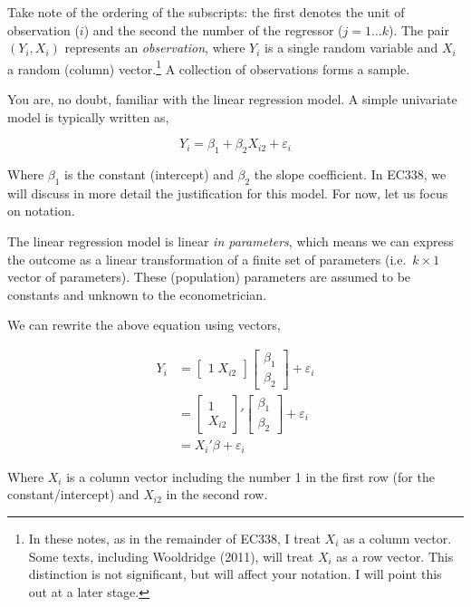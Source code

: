 \documentclass[
  letterpaper,
  DIV=11,
  numbers=noendperiod]{scrreprt}
\begin{document}
Take note of the ordering of the subscripts: the first denotes the unit
of observation (\(i\)) and the second the number of the regressor
(\(j=1\dots k\)). The pair \((Y_i,X_i)\) represents an
\emph{observation}, where \(Y_i\) is a single random variable and
\(X_i\) a random (column) vector.\footnote{In these notes, as in the
  remainder of EC338, I treat \(X_i\) as a column vector. Some texts,
  including Wooldridge (2011), will treat \(X_i\) as a row vector. This
  distinction is not significant, but will affect your notation. I will
  point this out at a later stage.} A collection of observations forms a
sample.

You are, no doubt, familiar with the linear regression model. A simple
univariate model is typically written as,

\[
Y_i = \beta_1 + \beta_2 X_{i2} + \varepsilon_i
\]

Where \(\beta_1\) is the constant (intercept) and \(\beta_2\) the slope
coefficient. In EC338, we will discuss in more detail the justification
for this model. For now, let us focus on notation.

The linear regression model is linear \emph{in parameters}, which means
we can express the outcome as a linear transformation of a finite set of
parameters (i.e.~\(k\times 1\) vector of parameters). These (population)
parameters are assumed to be constants and unknown to the
econometrician.

We can rewrite the above equation using vectors,

\[
\begin{align} Y_i &= \begin{bmatrix}1\;X_{i2}\end{bmatrix}\begin{bmatrix}\beta_1 \\ \beta_2\end{bmatrix} + \varepsilon_i \\
&= \begin{bmatrix}1\\ X_{i2}\end{bmatrix}'\begin{bmatrix}\beta_1 \\ \beta_2\end{bmatrix} + \varepsilon_i \\
&=X_i'\beta + \varepsilon_i
\end{align}
\]

Where \(X_i\) is a column vector including the number 1 in the first row
(for the constant/intercept) and \(X_{i2}\) in the second row.
\end{document}
